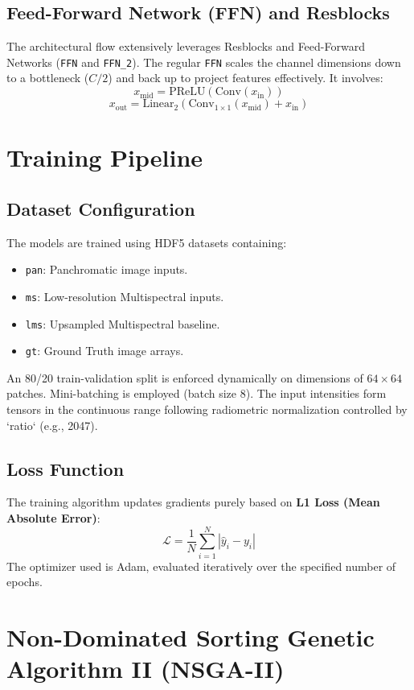 \documentclass[11pt]{article}
\begin{document}
\subsection{Feed-Forward Network (FFN) and Resblocks}
The architectural flow extensively leverages Resblocks and Feed-Forward Networks (\texttt{FFN} and \texttt{FFN\_2}).
The regular \texttt{FFN} scales the channel dimensions down to a bottleneck ($C/2$) and back up to project features effectively. It involves:
\[ x_{\text{mid}} = \text{PReLU}(\text{Conv}(x_{\text{in}})) \]
\[ x_{\text{out}} = \text{Linear}_2(\text{Conv}_{1 \times 1}(x_{\text{mid}}) + x_{\text{in}}) \]

\section{Training Pipeline}
\subsection{Dataset Configuration}
The models are trained using HDF5 datasets containing:
\begin{itemize}
    \item \texttt{pan}: Panchromatic image inputs.
    \item \texttt{ms}: Low-resolution Multispectral inputs.
    \item \texttt{lms}: Upsampled Multispectral baseline.
    \item \texttt{gt}: Ground Truth image arrays.
\end{itemize}
An 80/20 train-validation split is enforced dynamically on dimensions of $64 \times 64$ patches. Mini-batching is employed (batch size 8). The input intensities form tensors in the continuous range following radiometric normalization controlled by `ratio` (e.g., 2047).

\subsection{Loss Function}
The training algorithm updates gradients purely based on \textbf{L1 Loss (Mean Absolute Error)}:
\[ \mathcal{L} = \frac{1}{N} \sum_{i=1}^N \left| \hat{y}_i - y_i \right| \]
The optimizer used is Adam, evaluated iteratively over the specified number of epochs.

\section{Non-Dominated Sorting Genetic Algorithm II (NSGA-II)}
\end{document}
